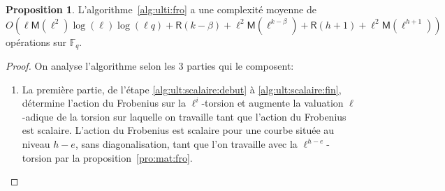 \documentclass[10pt,a4paper]{book}
\theoremstyle{plain}
\theoremstyle{definition}
\theoremstyle{definition}
\theoremstyle{definition}
\theoremstyle{definition}
\newtheorem{prop}[thm]{Proposition}
\theoremstyle{definition}
\theoremstyle{remark}
\theoremstyle{remark}
\theoremstyle{definition}
\begin{document}
\begin{prop}
\label{pro:alg:ulti}
L'algorithme~\ref{alg:ulti:fro} a une complexité moyenne de
\[O(\ell\mathsf{M}(\ell^2)\log(\ell)\log(\ell q)+\mathsf{R}(k-\beta) + \ell^2
\mathsf{M}(\ell^{k-\beta})+\mathsf{R}(h+1)+\ell^2 \mathsf{M}(\ell^{h+1}))\] 
opérations sur $\mathbb{F}_q$.
\end{prop}
\begin{proof}
On analyse l'algorithme selon les 3 parties qui le composent: 
\begin{enumerate}
\item La première partie, de l'étape \ref{alg:ult:scalaire:debut} à 
\ref{alg:ult:scalaire:fin}, détermine l'action du Frobenius sur la $\ell^i$-torsion 
et augmente la valuation $\ell$-adique de la torsion sur laquelle on travaille 
tant que l'action du Frobenius est scalaire. L'action du Frobenius est scalaire 
pour une courbe située au niveau $h-e$, sans diagonalisation, tant que l'on 
travaille avec la $\ell^{h-e}$-torsion par la proposition~\ref{pro:mat:fro}.


\end{enumerate}
\end{proof}
\end{document}
